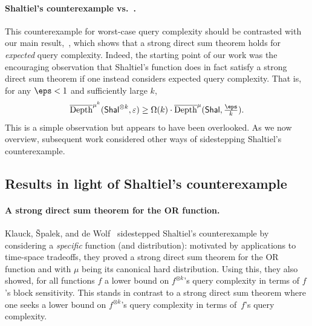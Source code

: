 \documentclass[11pt]{article}
\newcommand{\gnote}[1]{\footnote{{\bf \color{violet}Guy}: {#1}}}
\begin{document}
\paragraph{Shaltiel's counterexample vs.~.} This counterexample for worst-case query complexity should be contrasted with our main result,~, which shows that a strong direct sum theorem holds for {\sl expected} query complexity. 
Indeed, the starting point of our work was the encouraging observation that Shaltiel's function does in fact satisfy a strong direct sum theorem if one instead considers expected query complexity. That is, for any $\eps < 1$ and sufficiently large $k$,
\[ \overline{\mathrm{Depth}}^{\mu^k}(\mathsf{Shal}^{\otimes k},\varepsilon) \ge \Omega(k) \cdot\overline{\mathrm{Depth}}^{\mu}(\mathsf{Shal},\tfrac{\eps}{k}).\]
This is a simple observation but appears to have been overlooked. As we now overview, subsequent work considered other ways of sidestepping Shaltiel's counterexample. 




\subsection{Results in light of Shaltiel's counterexample}

\paragraph{A strong direct sum theorem for the OR function.} Klauck, {\v{S}}palek, and de Wolf~\cite{KSdW07} sidestepped Shaltiel’s counterexample by considering a {\sl specific} function (and distribution): motivated by applications to time-space tradeoffs, they proved a strong direct sum theorem for the OR function and with $\mu$ being its canonical hard distribution. Using this, they also showed, for all functions $f$ a lower bound on $f^{\otimes k}$'s query complexity in terms of $f$’s block sensitivity. This stands in contrast to a strong direct sum theorem where one seeks a lower bound on $f^{\otimes k}$'s query complexity in terms of~$f$’s query complexity. 
\end{document}
